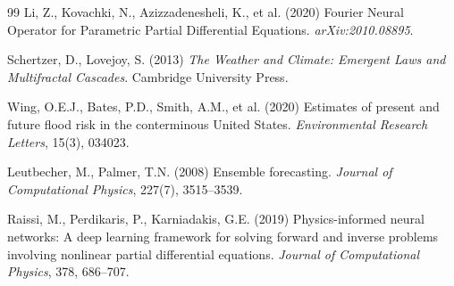 \documentclass{article}
\begin{document}
\begin{thebibliography}{99}
 Li, Z., Kovachki, N., Azizzadenesheli, K., et al. (2020)
    Fourier Neural Operator for Parametric Partial Differential Equations.
    \textit{arXiv:2010.08895}.

 Schertzer, D., Lovejoy, S. (2013)
    \textit{The Weather and Climate: Emergent Laws and Multifractal Cascades}.
    Cambridge University Press.

 Wing, O.E.J., Bates, P.D., Smith, A.M., et al. (2020)
    Estimates of present and future flood risk in the conterminous United States.
    \textit{Environmental Research Letters}, 15(3), 034023.

 Leutbecher, M., Palmer, T.N. (2008)
    Ensemble forecasting. \textit{Journal of Computational Physics},
    227(7), 3515--3539.

 Raissi, M., Perdikaris, P., Karniadakis, G.E. (2019)
    Physics-informed neural networks: A deep learning framework for solving
    forward and inverse problems involving nonlinear partial differential equations.
    \textit{Journal of Computational Physics}, 378, 686--707.

\end{thebibliography}
\end{document}
